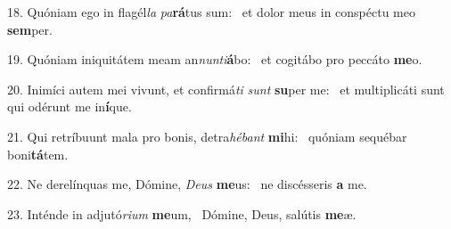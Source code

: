 18. Quóniam ego in flagél\textit{la} \textit{pa}\textbf{rá}tus sum: \ast\  et dolor meus in conspéctu meo \textbf{sem}per.\

19. Quóniam iniquitátem meam an\textit{nun}\textit{ti}\textbf{á}bo: \ast\  et cogitábo pro peccáto \textbf{me}o.\

20. Inimíci autem mei vivunt, et confirmá\textit{ti} \textit{sunt} \textbf{su}per me: \ast\  et multiplicáti sunt qui odérunt me in\textbf{í}que.\

21. Qui retríbuunt mala pro bonis, detra\textit{hé}\textit{bant} \textbf{mi}hi: \ast\  quóniam sequébar boni\textbf{tá}tem.\

22. Ne derelínquas me, Dómine, \textit{De}\textit{us} \textbf{me}us: \ast\  ne discésseris \textbf{a} me.\

23. Inténde in adjutó\textit{ri}\textit{um} \textbf{me}um, \ast\  Dómine, Deus, salútis \textbf{me}æ.\

